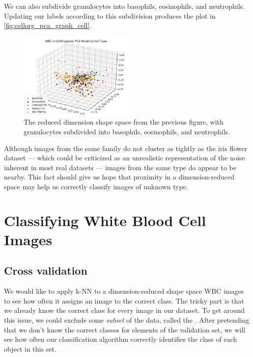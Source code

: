 We can also subdivide granulocytes into basophils, eosinophils, and neutrophils. Updating our labels according to this subdivision produces the plot in \autoref{fig:cellorg_pca_graph_cell}.

\begin{figure}[h]
\centering
\mySfFamily
\includegraphics[width = 0.5\textwidth]{../images/cellorg_pca_graph_cell.png}
\caption{The reduced dimension shape space from the previous figure, with granulocytes subdivided into basophils, eosinophils, and neutrophils.}
\label{fig:cellorg_pca_graph_cell}
\end{figure}

Although images from the same family do not cluster as tightly as the iris flower dataset --- which could be criticized as an unrealistic representation of the noise inherent in most real datasets --- images from the same type do appear to be nearby. This fact should give us hope that proximity in a dimension-reduced space may help us correctly classify images of unknown type.

\FloatBarrier
{}

\section{Classifying White Blood Cell Images}
\label{sec:training}

\subsection{Cross validation}

We would like to apply k-NN to a dimension-reduced shape space WBC images to see how often it assigns an image to the correct class. The tricky part is that we already know the correct class for every image in our dataset. To get around this issue, we could exclude some \textit{subset} of the data, called the . After pretending that we don't know the correct classes for elements of the validation set, we will see how often our classification algorithm correctly identifies the class of each object in this set.\\

